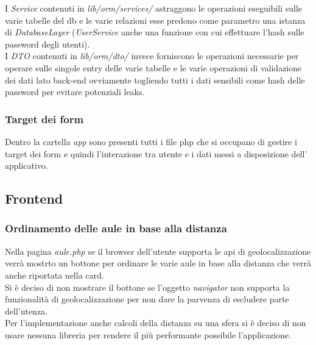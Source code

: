 I \textit{Service} contenuti in \textit{lib/orm/services/}
astraggono le operazioni eseguibili sulle varie tabelle del db e le varie
relazioni esse predono come parametro una istanza di \textit{DatabaseLayer}
(\textit{UserService} anche una funzione con cui effettuare l'hash sulle
password degli utenti).\\

I \textit{DTO} contenuti in \textit{lib/orm/dto/} invece forniscono le
operazioni necessarie per operare sulle singole entry delle varie tabelle e
le varie operazioni di validazione dei dati lato back-end ovviamente
togliendo tutti i dati sensibili come hash delle password per evitare
potenziali leaks.

\subsubsection{Target dei form}
Dentro la cartella \textit{app} sono presenti tutti i file php che si occupano
di gestire i target dei form e quindi l'interazione tra utente e i dati messi
a disposizione dell' applicativo.

\subsection{Frontend}

\subsubsection{Ordinamento delle aule in base alla distanza}
Nella pagina \textit{aule.php} se il browser dell'utente supporta le api di
geolocalizzazione verrà mostrto un bottone per ordinare le varie aule in base
alla distanza che verrà anche riportata nella card.\\

Si è deciso di non mostrare il bottone se l'oggetto \textit{navigator} non
supporta la funzionalità di geolocalizzazione per non dare la parvenza di
escludere parte dell'utenza.\\

Per l'implementazione anche calcoli della distanza su una sfera si è deciso di
non usare nessuna libreria per rendere il più performante possibile
l'applicazione.
